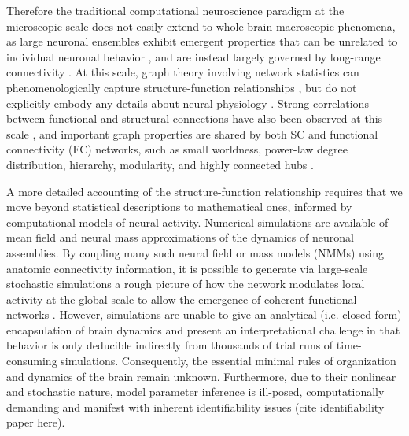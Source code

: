 Therefore the traditional computational neuroscience paradigm at the
microscopic scale does not easily extend to whole-brain macroscopic
phenomena, as large neuronal ensembles exhibit emergent properties that
can be unrelated to individual neuronal behavior
\cite{shimizu_co-operative_1983,misic_communication_2014,misic_cooperative_2015,robinson_multiscale_2005,destexhe_wilson-cowan_2009,abdelnour_network_2014}, and are instead largely governed by long-range
connectivity \cite{abdelnour_estimating_2015,Nakagawa2014,jirsa_spatiotemporal_2002,Deco2012}. At this scale, graph theory
involving network statistics can phenomenologically capture
structure-function relationships \cite{achard_resilient_2006,bullmore_complex_2009,strogatz_exploring_2001}, but do not
explicitly embody any details about neural physiology
\cite{misic_communication_2014,misic_cooperative_2015}. Strong correlations between functional and
structural connections have also been observed at this scale
\cite{honey_predicting_2009,abdelnour_network_2014,van_den_heuvel_functionally_2009,hermundstad_structural_2013,rubinov_symbiotic_2009,ghosh_cortical_2008,Abdelnour2018,park_structural_2013}, and important graph properties are shared by
both SC and functional connectivity (FC) networks, such as small
worldness, power-law degree distribution, hierarchy, modularity, and
highly connected hubs \cite{bullmore_complex_2009,he_temporal_2010}.

A more detailed accounting of the structure-function relationship
requires that we move beyond statistical descriptions to mathematical
ones, informed by computational models of neural activity. Numerical
simulations are available of mean field \cite{destexhe_wilson-cowan_2009,el_boustani_master_2009,wilson_mathematical_1973} and
neural mass \cite{Deco2012,david_neural_2003} approximations of the dynamics of
neuronal assemblies. By coupling many such neural field or mass models
(NMMs) using anatomic connectivity information, it is possible to
generate via large-scale stochastic simulations a rough picture of how
the network modulates local activity at the global scale to allow the
emergence of coherent functional networks \cite{Deco2012}. However,
simulations are unable to give an analytical (i.e. closed form)
encapsulation of brain dynamics and present an interpretational
challenge in that behavior is only deducible indirectly from thousands
of trial runs of time-consuming simulations. Consequently, the essential
minimal rules of organization and dynamics of the brain remain unknown.
Furthermore, due to their nonlinear and stochastic nature, model
parameter inference is ill-posed, computationally demanding and manifest
with inherent identifiability issues (cite identifiability paper here).

